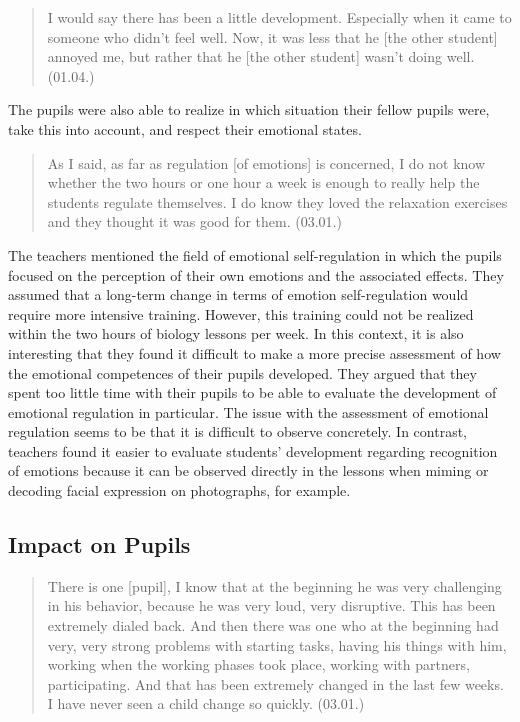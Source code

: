 \documentclass[11.5pt]{sig-alternate} %
\begin{document}
\begin{large}
\begin{quote}
    I would say there has been a little development. Especially when it came to someone who didn’t feel well. Now, it was less that he [the other student] annoyed me, but rather that he [the other student] wasn’t doing well. (01.04.)
\end{quote}

The pupils were also able to realize in which situation their fellow pupils were, take this into account, and respect their emotional states.

\begin{quote}
    As I said, as far as regulation [of emotions] is concerned, I do not know whether the two hours or one hour a week is enough to really help the students regulate themselves. I do know they loved the relaxation exercises and they thought it was good for them. (03.01.)
\end{quote}

The teachers mentioned the field of emotional self-regulation in which the pupils focused on the perception of their own emotions and the associated effects. They assumed that a long-term change in terms of emotion self-regulation would require more intensive training. However, this training could not be realized within the two hours of biology lessons per week. In this context, it is also interesting that they found it difficult to make a more precise assessment of how the emotional competences of their pupils developed. They argued that they spent too little time with their pupils to be able to evaluate the development of emotional regulation in particular. The issue with the assessment of emotional regulation seems to be that it is difficult to observe concretely. In contrast, teachers found it easier to evaluate students’ development regarding recognition of emotions because it can be observed directly in the lessons when miming or decoding facial expression on photographs, for example. 

\subsection*{Impact on Pupils}

\begin{quote}
    There is one [pupil], I know that at the beginning he was very challenging in his behavior, because he was very loud, very disruptive. This has been extremely dialed back. And then there was one who at the beginning had very, very strong problems with starting tasks, having his things with him, working when the working phases took place, working with partners, participating. And that has been extremely changed in the last few weeks. I have never seen a child change so quickly. (03.01.)
\end{quote}


\end{large}
\end{document}
